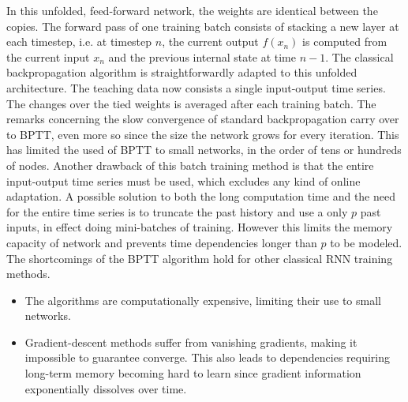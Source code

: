 \documentclass[12pt,oneside]{CUNY_CS_PhD}
\begin{document}
In this unfolded, feed-forward network, the weights are identical between the copies. The forward pass of one training batch consists of stacking a new layer at each timestep, i.e. at timestep $n$, the current output $f(x_n)$ is computed from the current input $x_n$ and the previous internal state at time $n-1$.
The classical backpropagation algorithm is straightforwardly adapted to this unfolded architecture. The teaching data now consists a single input-output time series. The changes over the tied weights is averaged after each training batch.
The remarks concerning the slow convergence of standard backpropagation carry over to BPTT, even more so since the size the network grows for every iteration. This has limited the used of BPTT to small networks, in the order of tens or hundreds of nodes. Another drawback of this batch training method is that the entire input-output time series must be used, which excludes any kind of online adaptation. A possible solution to both the long computation time and the need for the entire time series is to truncate the past history and use a only $p$  past inputs, in effect doing mini-batches of training. However this limits the memory capacity of network and prevents time dependencies longer than $p$ to be modeled.\\
The shortcomings of the BPTT algorithm hold for other classical RNN training methods.
\vspace{-1.7mm} %
\begin{itemize}[noitemsep]
\item The algorithms are computationally expensive, limiting their use to small networks.
\item Gradient-descent methods suffer from vanishing gradients, making it impossible to guarantee converge. This also leads to dependencies requiring long-term memory becoming hard to learn since gradient information exponentially dissolves over time.
\end{itemize}
\end{document}
